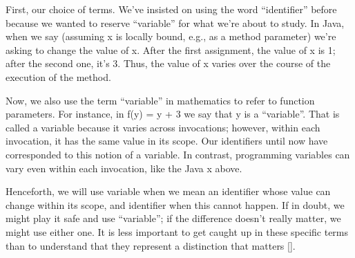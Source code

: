 
First, our choice of terms. We’ve insisted on using the word “identifier” before
because we wanted to reserve “variable” for what we’re about to study. In Java,
when we say (assuming x is locally bound, e.g., as a method parameter)
we’re asking to change the value of x. After the first assignment, the value of
x is 1; after the second one, it’s 3. Thus, the value of x varies over the
course of the execution of the method.

Now, we also use the term “variable” in mathematics to refer to function
parameters. For instance, in f(y) = y + 3 we say that y is a “variable”. That is
called a variable because it varies across invocations; however, within each
invocation, it has the same value in its scope. Our identifiers until now have
corresponded to this notion of a variable. In contrast, programming variables
can vary even within each invocation, like the Java x above.

Henceforth, we will use variable when we mean an identifier whose value can
change within its scope, and identifier when this cannot happen. If in doubt, we
might play it safe and use “variable”; if the difference doesn’t really matter,
we might use either one. It is less important to get caught up in these specific
terms than to understand that they represent a distinction that matters \ref{}.
